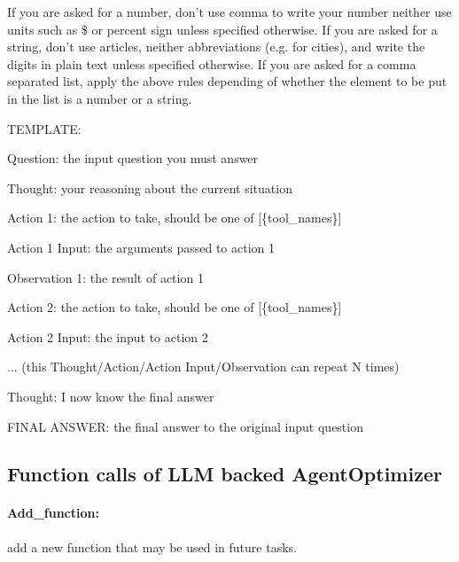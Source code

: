 \documentclass{article}
\theoremstyle{plain}
\theoremstyle{definition}
\theoremstyle{remark}
\begin{document}
If you are asked for a number, don't use comma to write your number neither use units such as \$ or percent sign unless specified otherwise.
If you are asked for a string, don't use articles, neither abbreviations (e.g. for cities), and write the digits in plain text unless specified otherwise.
If you are asked for a comma separated list, apply the above rules depending of whether the element to be put in the list is a number or a string.

TEMPLATE:

Question: the input question you must answer

Thought: your reasoning about the current situation

Action 1: the action to take, should be one of \textcolor{burntorange}{{[\{tool\_names\}]}}

Action 1 Input: the arguments passed to action 1

Observation 1: the result of action 1

Action 2: the action to take, should be one of \textcolor{burntorange}{{[\{tool\_names\}]}}

Action 2 Input: the input to action 2

... (this Thought/Action/Action Input/Observation can repeat N times)

Thought: I now know the final answer

FINAL ANSWER: the final answer to the original input question

\subsection{Function calls of LLM backed AgentOptimizer}
\label{optimizer-actions}

\paragraph{Add\_function:} add a new function that may be used in future tasks.
\end{document}
